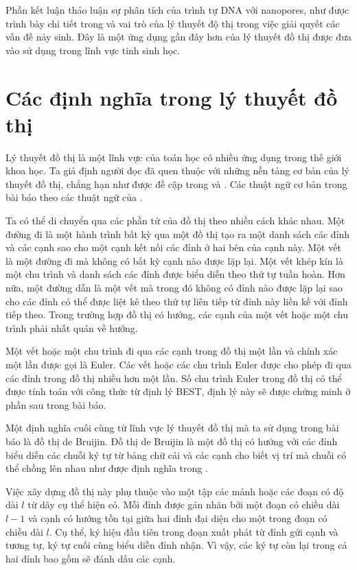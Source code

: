 \documentclass[14pt, a4paper]{article}
\numberwithin{equation}{section}
\numberwithin{figure}{section}
\numberwithin{dl}{section}
\numberwithin{md}{section}
\numberwithin{bd}{section}
\numberwithin{dn}{section}
\numberwithin{hq}{section}
\begin{document}
    Phần kết luận thảo luận sự phân tích của trình tự DNA với nanopores, như được trình bày chi tiết trong \cite{bokhari2005parallel} và vai trò của lý thuyết độ thị trong việc giải quyết các vấn đề nảy sinh.
    Đây là một ứng dụng gần đây hơn của lý thuyết đồ thị được đưa vào sử dụng trong lĩnh vực tinh sinh học.
    
    \section{Các định nghĩa trong lý thuyết đồ thị}

    Lý thuyết đồ thị là một lĩnh vực của toán học có nhiều ứng dụng trong thế giới khoa học.
    Ta giả định người đọc đã quen thuộc với những nền tảng cơ bản của lý thuyết đồ thị, chẳng hạn như được đề cập trong \cite{tucker2006applied} và \cite{west2001introduction}.
    Các thuật ngữ cơ bản trong bài báo theo các thuật ngữ của \cite{west2001introduction}.

    Ta có thể di chuyển qua các phần tử của đồ thị theo nhiều cách khác nhau.
    Một đường đi là một hành trình bất kỳ qua một đồ thị tạo ra một danh sách các đỉnh và các cạnh sao cho một cạnh kết nối các đỉnh ở hai bên của cạnh này.
    Một vết là một đường đi mà không có bất kỳ cạnh nào được lặp lại.
    Một vết khép kín là một chu trình và danh sách các đỉnh được biểu diễn theo thứ tự tuần hoàn.
    Hơn nữa, một đường dẫn là một vết mà trong đó không có đỉnh nào được lặp lại sao cho các đỉnh có thể được liệt kê theo thứ tự liên tiếp từ đỉnh này liền kề với đỉnh tiếp theo.
    Trong trường hợp đồ thị có hướng, các cạnh của một vết hoặc một chu trình phải nhất quán về hướng.

    Một vết hoặc một chu trình đi qua các cạnh trong đồ thị một lần và chính xác một lần được gọi là Euler.
    Các vết hoặc các chu trình Euler được cho phép đi qua các đỉnh trong đồ thị nhiều hơn một lần.
    Số chu trình Euler trong đồ thị có thể được tính toán với công thức từ định lý BEST, định lý này sẽ được chứng minh ở phần sau trong bài báo.

    Một định nghĩa cuối cùng từ lĩnh vực lý thuyết đồ thị mà ta sử dụng trong bài báo là đồ thị de Bruijin.
    Đồ thị de Bruijin là một đồ thị có hướng với các đỉnh biểu diễn các chuỗi ký tự từ bảng chữ cái và các cạnh cho biết vị trí mà chuỗi có thể chồng lên nhau như được định nghĩa trong \cite{de1946combinatorial}.

    Việc xây dựng đồ thị này phụ thuộc vào một tập các mảnh hoặc các đoạn có độ dài $l$ từ dãy cụ thể hiện có.
    Mỗi đỉnh được gán nhãn bởi một đoạn có chiều dài $l-1$ và cạnh có hướng tồn tại giữa hai đỉnh đại diện cho một trong đoạn có chiều dài $l$.
    Cụ thể, ký hiệu đầu tiên trong đoạn xuất phát từ đỉnh gửi cạnh và tương tự, ký tự cuối cùng biểu diễn đỉnh nhận.
    Vì vậy, các ký tự còn lại trong cả hai đỉnh bao gồm sẽ đánh dấu các cạnh.
\end{document}
